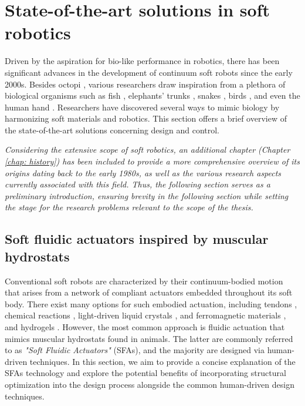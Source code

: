 \section{State-of-the-art solutions in soft robotics}
Driven by the aspiration for bio-like performance in robotics, there has been significant advances in the development of continuum soft robots since the early 2000s. Besides octopi \cite{Renda2018}, various researchers draw inspiration from a plethora of biological organisms such as fish \cite{Katzschmann2018,Marchese2015}, elephants' trunks \cite{Jones2006,Wehner2016,Godage2015}, snakes \cite{Rafsanjani2018Feb,Gazzola2018,Marchese2015}, birds \cite{Gazzola2018,Zufferey2022Dec}, and even the human hand \cite{vanLaake2022Sep,Fras2018Oct}. Researchers have discovered several ways to mimic biology by harmonizing soft materials and robotics. This section offers a brief overview of the state-of-the-art solutions concerning design and control.

\begin{rmk}
\textit{Considering the extensive scope of soft robotics, an additional chapter (Chapter \ref{chap: history}) has been included to provide a more comprehensive overview of its origins dating back to the early 1980s, as well as the various research aspects currently associated with this field. Thus, the following section serves as a preliminary introduction, ensuring brevity in the following section while setting the stage for the research problems relevant to the scope of the thesis.}
\end{rmk}

\subsection{Soft fluidic actuators inspired by muscular hydrostats}
 Conventional soft robots are characterized by their continuum-bodied motion that arises from a network of compliant actuators embedded throughout its soft body. There exist many options for such embodied actuation, including tendons \cite{Jones2006,Renda2018}, chemical reactions \cite{Bartlett2015,Hubbard2021}, light-driven liquid crystals \cite{Vantomme2021,Pilz2020,daCunha2020}, and ferromagnetic materials \cite{Kim2019AugMagnet,Venkiteswaran2019Feb}, and hydrogels \cite{Jiao2022Jun,Lee2020Dec}. However, the most common approach is fluidic actuation \cite{Katzschmann2018,Marchese2015,Overvelde2015Sep,vanLaake2022Sep} that mimics muscular hydrostats found in animals. The latter are commonly referred to as \emph{"Soft Fluidic Actuators"} (SFAs), and the majority are designed via human-driven techniques. In this section, we aim to provide a concise explanation of the SFAs technology and explore the potential benefits of incorporating structural optimization into the design process alongside the common human-driven design techniques.

